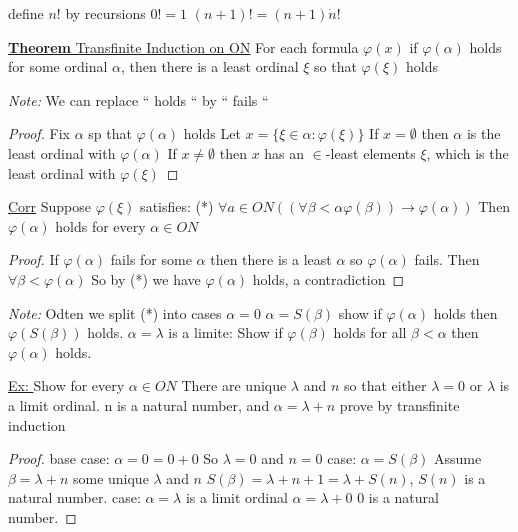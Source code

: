 \documentclass{article}
\newcommand{\set}[1]{\{#1\}}
\begin{document}
    define $n!$ by recursions
    $0! = 1$
    $(n+1)! = (n+1) \dot n!$

    \underline{\textbf{Theorem} Transfinite Induction on ON}
    For each formula $\varphi (x)$ if $\varphi(\alpha)$ holds for some ordinal $\alpha$, then there is a least ordinal $\xi$ so that $\varphi(\xi)$ holds

    \emph{Note: } We can replace `` holds `` by `` fails ``
    \begin{proof}
        Fix $\alpha$ sp that $\varphi(\alpha)$ holds
        Let $x = \set{\xi \in \alpha : \varphi(\xi)}$
        If $ x = \emptyset$ then $\alpha$ is the least ordinal with $\varphi(\alpha)$
        If $x \neq \emptyset$ then $x$ has an $\in$-least elements $\xi$, which is the least ordinal with $\varphi(\xi)$
    \end{proof}

    \underline{Corr} Suppose $\varphi(\xi)$ satisfies:
    (*) $\forall a \in ON (( \forall \beta < \alpha \varphi(\beta)) \rightarrow \varphi(\alpha))$
    Then $\varphi(\alpha)$ holds for every $\alpha \in ON$

    \begin{proof}
        If $\varphi(\alpha)$ fails for some $\alpha$ then there is a least $\alpha$ so $\varphi(\alpha)$ fails.
        Then $\forall \beta < \varphi(\alpha)$
        So by (*) we have $\varphi(\alpha)$ holds, a contradiction
    \end{proof}

    \emph{Note: } Odten we split (*) into cases
    $\alpha = 0$
    $\alpha = S(\beta)$ show if $\varphi(\alpha)$ holds then $\varphi(S(\beta))$ holds.
    $\alpha = \lambda$ is a limite: Show if $\varphi(\beta)$ holds for all $\beta < \alpha$ then $\varphi(\alpha)$ holds.

    \underline{Ex: } Show for every $\alpha \in ON$
    There are unique $\lambda$ and $n$ so that either $\lambda = 0$ or $\lambda$ is a limit ordinal.
    n is a natural number, and $\alpha = \lambda + n$
    prove by transfinite induction
    \begin{proof}
        base case:
        $\alpha = 0 = 0 + 0$
        So $\lambda = 0$ and $n = 0$
        case:
        $\alpha = S(\beta)$ Assume $\beta = \lambda + n$ some unique $\lambda$ and $n$
        $S(\beta) = \lambda + n + 1 = \lambda + S(n)$, $S(n)$ is a natural number.
        case:
        $\alpha = \lambda$ is a limit ordinal
        $\alpha = \lambda + 0$ 0 is a natural number.
    \end{proof}
\end{document}
